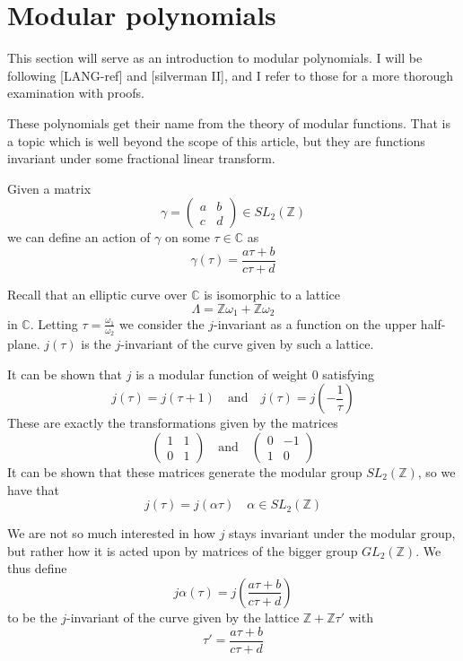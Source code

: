 \section{Modular polynomials}
This section will serve as an introduction to modular polynomials.
I will be following [LANG-ref] and [silverman II], and I refer to those for a more thorough examination
with proofs.

These polynomials get their name from the theory of modular functions. That is a topic which is
well beyond the scope of this article, but they are functions invariant under some fractional linear
transform. 

Given a matrix
$$ \gamma = \begin{pmatrix}
 a & b \\ c & d
\end{pmatrix} \in SL_2(\mathbb{Z})$$
we can define an action of $\gamma$ on some $\tau \in \mathbb{C}$ as
$$\gamma(\tau) = \frac{a\tau + b}{c\tau + d} $$

Recall that an elliptic curve over $\mathbb{C}$ is isomorphic to a lattice
$$\Lambda = \mathbb{Z}\omega_1 + \mathbb{Z}\omega_2$$ in $\mathbb{C}$.
Letting $\tau = \frac{\omega_1}{\omega_2}$ we consider the $j$-invariant as a function
on the upper half-plane. $j(\tau)$ is the $j$-invariant of the curve given by such a lattice.

It can be shown that $j$ is a modular function of weight $0$ satisfying
$$ j(\tau) = j(\tau + 1) \quad \text{and} \quad j(\tau) = j(-\frac{1}{\tau}) $$
These are exactly the transformations given by the matrices
$$ \begin{pmatrix} 1 & 1 \\ 0 & 1 \end{pmatrix} \quad \text{and} \quad
   \begin{pmatrix} 0 & -1 \\ 1 & 0 \end{pmatrix} $$
It can be shown that these matrices generate the modular group $SL_2(\mathbb{Z})$,
so we have that
$$j(\tau) = j(\alpha \tau) \quad \alpha \in SL_2(\mathbb{Z}) $$

We are not so much interested in how $j$ stays invariant under the modular group,
but rather how it is acted upon by matrices of the bigger group $GL_2(\mathbb{Z})$.
We thus define
$$ j \alpha(\tau) = j\left(\frac{a\tau + b}{c\tau + d}\right) $$
to be the $j$-invariant of the curve given by the lattice $\mathbb{Z}+\mathbb{Z}\tau'$
with $$\tau' = \frac{a\tau + b}{c\tau + d}$$

